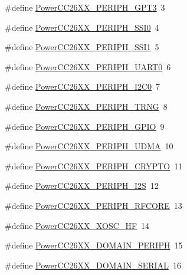 \begin{DoxyCompactItemize}
\item 
\#define \hyperlink{_power_c_c26_x_x_8h_a554b5da09234a5a12deabe92e8c60112}{Power\+C\+C26\+X\+X\+\_\+\+P\+E\+R\+I\+P\+H\+\_\+\+G\+P\+T3}~3
\item 
\#define \hyperlink{_power_c_c26_x_x_8h_a0086b3809cd19916dc83fe3707ae721f}{Power\+C\+C26\+X\+X\+\_\+\+P\+E\+R\+I\+P\+H\+\_\+\+S\+S\+I0}~4
\item 
\#define \hyperlink{_power_c_c26_x_x_8h_af0bae9873af0845e4a1151e4f1717113}{Power\+C\+C26\+X\+X\+\_\+\+P\+E\+R\+I\+P\+H\+\_\+\+S\+S\+I1}~5
\item 
\#define \hyperlink{_power_c_c26_x_x_8h_a1fcd75795174d11d9bcf8fedae2e63fc}{Power\+C\+C26\+X\+X\+\_\+\+P\+E\+R\+I\+P\+H\+\_\+\+U\+A\+R\+T0}~6
\item 
\#define \hyperlink{_power_c_c26_x_x_8h_a1637c7e9df94ea4619c8c72594071b92}{Power\+C\+C26\+X\+X\+\_\+\+P\+E\+R\+I\+P\+H\+\_\+\+I2\+C0}~7
\item 
\#define \hyperlink{_power_c_c26_x_x_8h_af7aecb869e5c26ebc49257026be7269c}{Power\+C\+C26\+X\+X\+\_\+\+P\+E\+R\+I\+P\+H\+\_\+\+T\+R\+N\+G}~8
\item 
\#define \hyperlink{_power_c_c26_x_x_8h_aa1cabaa5a4591d59c71b88e94923b89a}{Power\+C\+C26\+X\+X\+\_\+\+P\+E\+R\+I\+P\+H\+\_\+\+G\+P\+I\+O}~9
\item 
\#define \hyperlink{_power_c_c26_x_x_8h_a9f672f8e724079777b448f3e31a63307}{Power\+C\+C26\+X\+X\+\_\+\+P\+E\+R\+I\+P\+H\+\_\+\+U\+D\+M\+A}~10
\item 
\#define \hyperlink{_power_c_c26_x_x_8h_ab7e5798bed1f87a647ca6a963e0c3336}{Power\+C\+C26\+X\+X\+\_\+\+P\+E\+R\+I\+P\+H\+\_\+\+C\+R\+Y\+P\+T\+O}~11
\item 
\#define \hyperlink{_power_c_c26_x_x_8h_abe23c943cc254781d2193b054dbf8685}{Power\+C\+C26\+X\+X\+\_\+\+P\+E\+R\+I\+P\+H\+\_\+\+I2\+S}~12
\item 
\#define \hyperlink{_power_c_c26_x_x_8h_a915d52fe49b00163be68301b8e3e23fc}{Power\+C\+C26\+X\+X\+\_\+\+P\+E\+R\+I\+P\+H\+\_\+\+R\+F\+C\+O\+R\+E}~13
\item 
\#define \hyperlink{_power_c_c26_x_x_8h_a0363d14e004e085a63c2bf312542d11a}{Power\+C\+C26\+X\+X\+\_\+\+X\+O\+S\+C\+\_\+\+H\+F}~14
\item 
\#define \hyperlink{_power_c_c26_x_x_8h_aaa165396fa3e549f034262cbd7c527dd}{Power\+C\+C26\+X\+X\+\_\+\+D\+O\+M\+A\+I\+N\+\_\+\+P\+E\+R\+I\+P\+H}~15
\item 
\#define \hyperlink{_power_c_c26_x_x_8h_a80c11363509b3eb0ca1587b24439b764}{Power\+C\+C26\+X\+X\+\_\+\+D\+O\+M\+A\+I\+N\+\_\+\+S\+E\+R\+I\+A\+L}~16

\end{DoxyCompactItemize}
